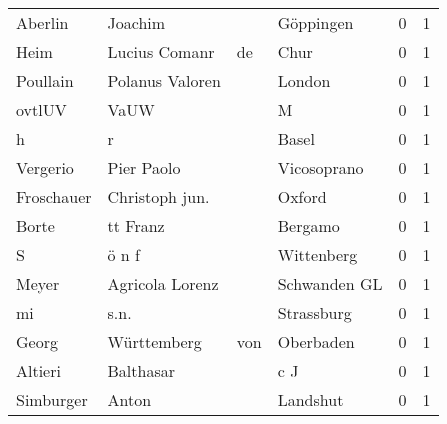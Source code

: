 \begin{center}
\begin{tiny}
\begin{longtabu}{llllrr}
                  Aberlin &                            Joachim &             &                                   Göppingen &          0 &         1 \\
                     Heim &                      Lucius Comanr &          de &                                        Chur &          0 &         1 \\
                 Poullain &                    Polanus Valoren &             &                                      London &          0 &         1 \\
                   ovtlUV &                               VaUW &             &                                           M &          0 &         1 \\
                        h &                                  r &             &                                       Basel &          0 &         1 \\
                 Vergerio &                         Pier Paolo &             &                                 Vicosoprano &          0 &         1 \\
               Froschauer &                     Christoph jun. &             &                                      Oxford &          0 &         1 \\
                    Borte &                           tt Franz &             &                                     Bergamo &          0 &         1 \\
                        S &                              ö n f &             &                                  Wittenberg &          0 &         1 \\
                    Meyer &                    Agricola Lorenz &             &                                Schwanden GL &          0 &         1 \\
                       mi &                               s.n. &             &                                  Strassburg &          0 &         1 \\
                    Georg &                        Württemberg &         von &                                   Oberbaden &          0 &         1 \\
                  Altieri &                          Balthasar &             &                                         c J &          0 &         1 \\
                Simburger &                              Anton &             &                                    Landshut &          0 &         1 \\

\end{longtabu}
\end{tiny}
\end{center}

